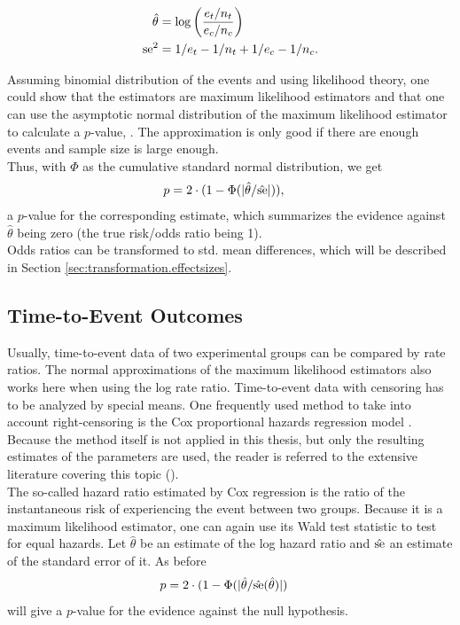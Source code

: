 \documentclass[11pt,a4paper,twoside]{book}\usepackage[]{graphicx}\usepackage[]{color}
\begin{document}
\begin{align}
\hat{\theta} &= \log\bigg(\frac{e_t/n_t}{e_c/n_c}\bigg) \label{eq:risk.ratio} \\
\operatorname{se}^2&= 1/e_t - 1/n_t + 1/e_c - 1/n_c. \label{eq:risk.ratio.variance}
\end{align}

Assuming binomial distribution of the events and using likelihood theory, one could show that the estimators are maximum likelihood estimators and that one can use the asymptotic normal distribution of the maximum likelihood estimator to calculate a  $p$\hspace{0.4mm}-value, \eg \cite[98]{held2014}. The approximation is only good if there are enough events and sample size is large enough.\\
Thus, with $\Phi$ as the cumulative standard normal distribution, we get
\begin{align}
p &= 2\cdot(1-\Phi(|\hat{\theta}/\hat{\operatorname{se}}|)), \nonumber
\end{align}
a $p$\hspace{0.4mm}-value for the corresponding estimate, which summarizes the evidence against $\hat{\theta}$ being zero (\ie the true risk/odds ratio being 1). \\
Odds ratios can be transformed to std. mean differences, which will be described in Section \ref{sec:transformation.effectsizes}.

\subsection{Time-to-Event Outcomes}
Usually, time-to-event data of two experimental groups can be compared by rate ratios. The normal approximations of the maximum likelihood estimators also works here when using the log rate ratio.
Time-to-event data with censoring has to be analyzed by special means. One frequently used method to take into account right-censoring is the Cox proportional hazards regression model \citep{Cox}. Because the method itself is not applied in this thesis, but only the resulting estimates of the parameters are used, the reader is referred to the extensive literature covering this topic (\eg \citealp{Surv}). \\
The so-called hazard ratio estimated by Cox regression is the ratio of the instantaneous risk of experiencing the event between two groups. Because it is a maximum likelihood estimator, one can again use its Wald test statistic to test for equal hazards. Let $\hat{\theta}$ be an estimate of the log hazard ratio and $\hat{\operatorname{se}}$ an estimate of the standard error of it. As before
\begin{align}
p &= 2\cdot(1-\Phi(|\hat{\theta}/\hat{\operatorname{se}}(\hat{\theta})|) \nonumber
\end{align}
will give a  $p$\hspace{0.4mm}-value for the evidence against the null hypothesis.
\end{document}

